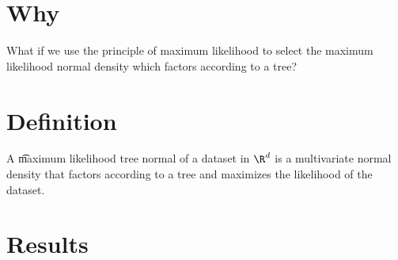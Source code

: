 
\section*{Why}

What if we use the principle of maximum likelihood to select the maximum likelihood normal density which factors according to a tree?

\section*{Definition}

A \t{maximum likelihood tree normal} of a dataset in $\R ^d$ is a multivariate normal density that factors according to a tree and maximizes the likelihood of the dataset.

\section*{Results}

